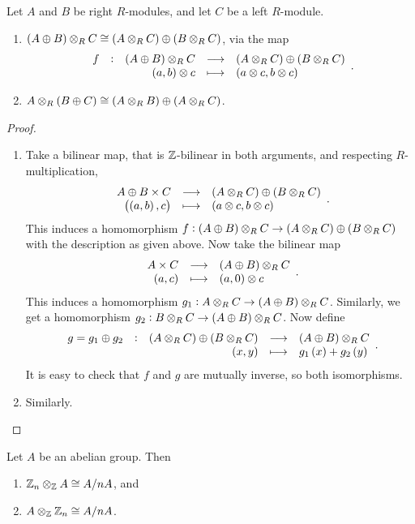 \pagebreak

\begin{corollary}
Let $ A $ and $ B $ be right $ R $-modules, and let $ C $ be a left $ R $-module.
\begin{enumerate}
\item $ \br{A \oplus B} \otimes_R C \cong \br{A \otimes_R C} \oplus \br{B \otimes_R C} $, via the map
$$ \function[f]{\br{A \oplus B} \otimes_R C}{\br{A \otimes_R C} \oplus \br{B \otimes_R C}}{\br{a, b} \otimes c}{\br{a \otimes c, b \otimes c}}. $$
\item $ A \otimes_R \br{B \oplus C} \cong \br{A \otimes_R B} \oplus \br{A \otimes_R C} $.
\end{enumerate}
\end{corollary}

\begin{proof}
\hfill
\begin{enumerate}
\item Take a bilinear map, that is $ \mathbb{Z} $-bilinear in both arguments, and respecting $ R $-multiplication,
$$ \function{A \oplus B \times C}{\br{A \otimes_R C} \oplus \br{B \otimes_R C}}{\br{\br{a, b}, c}}{\br{a \otimes c, b \otimes c}}. $$
This induces a homomorphism $ f : \br{A \oplus B} \otimes_R C \to \br{A \otimes_R C} \oplus \br{B \otimes_R C} $ with the description as given above. Now take the bilinear map
$$ \function{A \times C}{\br{A \oplus B} \otimes_R C}{\br{a, c}}{\br{a, 0} \otimes c}. $$
This induces a homomorphism $ g_1 : A \otimes_R C \to \br{A \oplus B} \otimes_R C $. Similarly, we get a homomorphism $ g_2 : B \otimes_R C \to \br{A \oplus B} \otimes_R C $. Now define
$$ \function[g = g_1 \oplus g_2]{\br{A \otimes_R C} \oplus \br{B \otimes_R C}}{\br{A \oplus B} \otimes_R C}{\br{x, y}}{g_1\br{x} + g_2\br{y}}. $$
It is easy to check that $ f $ and $ g $ are mutually inverse, so both isomorphisms.
\item Similarly.
\end{enumerate}
\end{proof}

\begin{corollary}
Let $ A $ be an abelian group. Then
\begin{enumerate}
\item $ \mathbb{Z}_n \otimes_{\mathbb{Z}} A \cong A / nA $, and
\item $ A \otimes_{\mathbb{Z}} \mathbb{Z}_n \cong A / nA $.
\end{enumerate}
\end{corollary}

